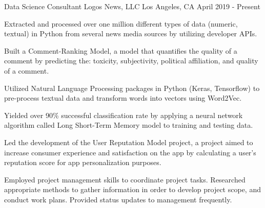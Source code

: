 

\begin{cventries}

  \cventry
    {Data Science Consultant} %
    {Logos News, LLC} %
    {Los Angeles, CA} %
    {April 2019 - Present} %
    {
      \begin{cvitems} %
        \item {Extracted and processed over one million different types of data (numeric, textual) in Python from several news media sources by utilizing developer APIs.}
        \item {Built a Comment-Ranking Model, a model that quantifies the quality of a comment by predicting the: toxicity, subjectivity, political affiliation, and quality of a comment.}  
        \vspace{4mm}
        \begin{cvitems}
        	\item {Utilized Natural Language Processing packages in Python (Keras, Tensorflow) to pre-process textual data and transform words into vectors using Word2Vec.}
        	\item {Yielded over 90\% successful classification rate by applying a neural network algorithm called Long Short-Term Memory model to training and testing data.}
        \end{cvitems}
        \vspace{4mm}
        \item {Led the development of the User Reputation Model project, a project aimed to increase consumer experience and satisfaction on the app by calculating a user’s reputation score for app personalization purposes.}
        \vspace{4mm}
        \begin{cvitems}
        	\item {Employed project management skills to coordinate project tasks. Researched appropriate methods to gather information in order to develop project scope, and conduct work plans. Provided status updates to management frequently.}
        \end{cvitems}
    	\vspace{4mm}
      \end{cvitems}
    }


\end{cventries}
